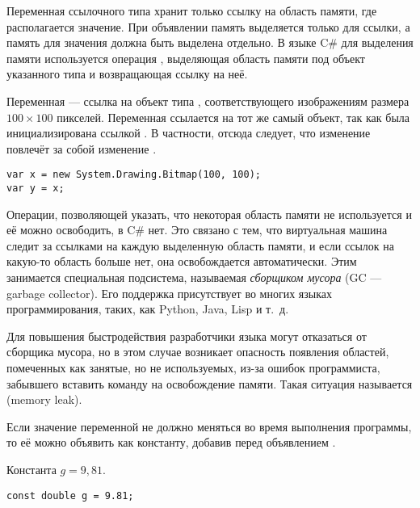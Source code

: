 Переменная ссылочного типа хранит только ссылку на область памяти, где
располагается значение. При объявлении память выделяется только для
ссылки, а память для значения должна быть выделена отдельно. В языке
C\# для выделения памяти используется операция ,
выделяющая область памяти под объект указанного типа и возвращающая
ссылку на неё.

\begin{example}
Переменная  — ссылка на объект типа
, соответствующего
изображениям размера $100\times100$ пикселей.  Переменная 
ссылается на тот же самый объект, так как была инициализирована
ссылкой . В частности, отсюда следует, что изменение
 повлечёт за собой изменение .

\begin{lstlisting}
var x = new System.Drawing.Bitmap(100, 100);
var y = x;
\end{lstlisting}
\end{example}


Операции, позволяющей указать, что некоторая область памяти не
используется и её можно освободить, в C\# нет. Это связано с тем, что
виртуальная машина следит за ссылками на каждую выделенную область
памяти, и если ссылок на какую-то область больше нет, она
освобождается автоматически.  Этим занимается специальная подсистема,
называемая \emph{сборщиком мусора} (GC — garbage collector). Его
поддержка присутствует во многих языках программирования, таких, как
Python, Java, Lisp и т.~д.

Для повышения быстродействия разработчики языка могут отказаться от
сборщика мусора, но в этом случае возникает опасность появления
областей, помеченных как занятые, но не используемых, из-за ошибок
программиста, забывшего вставить команду на освобождение памяти. Такая
ситуация называется  (memory
leak).


Если значение переменной не должно меняться во время выполнения
программы, то её можно объявить как константу, добавив перед
объявлением .

\begin{example}
Константа $g=9{,}81.$

\begin{lstlisting}
const double g = 9.81;
\end{lstlisting}
\end{example}

